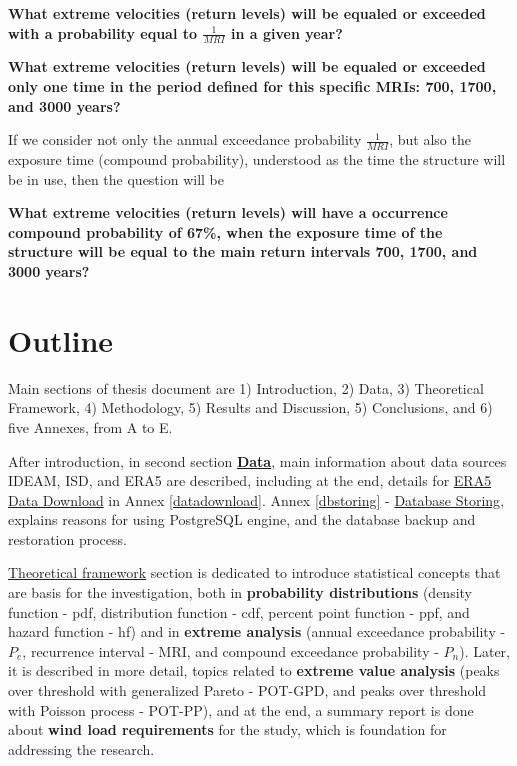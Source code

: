 \documentclass[12pt,oneside]{reedthesis}
\begin{document}
\textbf{What extreme velocities (return levels) will be equaled or exceeded with a probability equal to \(\frac{1}{MRI}\) in a given year?}

\textbf{What extreme velocities (return levels) will be equaled or exceeded only one time in the period defined for this specific MRIs: 700, 1700, and 3000 years?}

If we consider not only the annual exceedance probability \(\frac{1}{MRI}\), but also the exposure time (compound probability), understood as the time the structure will be in use, then the question will be

\textbf{What extreme velocities (return levels) will have a occurrence compound probability of 67\%, when the exposure time of the structure will be equal to the main return intervals 700, 1700, and 3000 years?}

\hypertarget{outline}{%
\section{Outline}\label{outline}}

Main sections of thesis document are 1) Introduction, 2) Data, 3) Theoretical Framework, 4) Methodology, 5) Results and Discussion, 5) Conclusions, and 6) five Annexes, from A to E.

After introduction, in second section \textbf{\protect\hyperlink{rmd-data}{Data}}, main information about data sources IDEAM, ISD, and ERA5 are described, including at the end, details for \protect\hyperlink{era5download}{ERA5 Data Download} in Annex \ref{datadownload}. Annex \ref{dbstoring} - \protect\hyperlink{dbstoring}{Database Storing}, explains reasons for using PostgreSQL engine, and the database backup and restoration process.

\protect\hyperlink{rmd-thefra}{Theoretical framework} section is dedicated to introduce statistical concepts that are basis for the investigation, both in \textbf{probability distributions} (density function - pdf, distribution function - cdf, percent point function - ppf, and hazard function - hf) and in \textbf{extreme analysis} (annual exceedance probability - \(P_e\), recurrence interval - MRI, and compound exceedance probability - \(P_n\)). Later, it is described in more detail, topics related to \textbf{extreme value analysis} (peaks over threshold with generalized Pareto - POT-GPD, and peaks over threshold with Poisson process - POT-PP), and at the end, a summary report is done about \textbf{wind load requirements} for the study, which is foundation for addressing the research.
\end{document}
